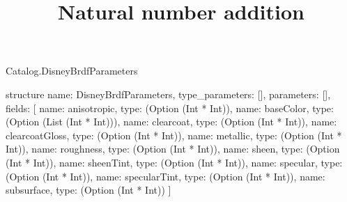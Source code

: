 \begin{lexlean}{Catalog.DisneyBrdfParameters}
\title{Natural number addition}
\begin{semanticmodule}
structure{
  name: DisneyBrdfParameters,
  type_parameters: [],
  parameters: [],
  fields: [
    {name: anisotropic, type: (Option (Int * Int))},
    {name: baseColor, type: (Option (List (Int * Int)))},
    {name: clearcoat, type: (Option (Int * Int))},
    {name: clearcoatGloss, type: (Option (Int * Int))},
    {name: metallic, type: (Option (Int * Int))},
    {name: roughness, type: (Option (Int * Int))},
    {name: sheen, type: (Option (Int * Int))},
    {name: sheenTint, type: (Option (Int * Int))},
    {name: specular, type: (Option (Int * Int))},
    {name: specularTint, type: (Option (Int * Int))},
    {name: subsurface, type: (Option (Int * Int))}
  ]
}
\end{semanticmodule}
\end{lexlean}
